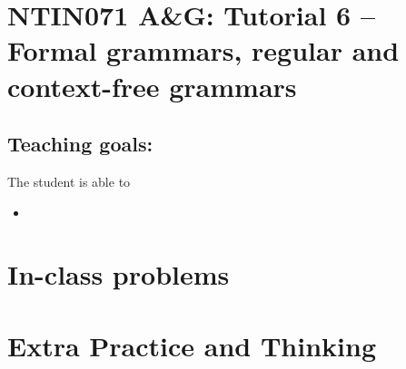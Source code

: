 \documentclass[a4paper,12pt]{amsart}
\begin{document}
\thispagestyle{empty}

\section*{NTIN071 A\&G: Tutorial 6 -- Formal grammars, regular and context-free grammars}

\medskip

\subsection*{Teaching goals:} The student is able to

    \begin{itemize}\setlength{\itemsep}{0pt}
        \item 
    \end{itemize}


\section*{In-class problems}


\medskip\begin{problem}

\end{problem}


\section*{Extra Practice and Thinking}


\medskip\begin{problem}

\end{problem}
\end{document}
